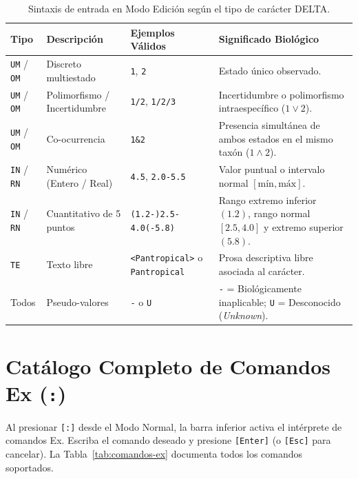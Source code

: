 \documentclass[11pt,a4paper]{article}
\newcommand{\keystroke}[1]{\texttt{[#1]}}
\begin{document}
\begin{table}[ht]
\centering
\small
\caption{Sintaxis de entrada en Modo Edición según el tipo de carácter DELTA.}
\label{tab:sintaxis-edicion}
\begin{tabularx}{\textwidth}{@{}l l l X@{}}
\toprule
\textbf{Tipo} & \textbf{Descripción} & \textbf{Ejemplos Válidos} & \textbf{Significado Biológico} \\
\midrule
\texttt{UM} / \texttt{OM} & Discreto multiestado & \texttt{1}, \texttt{2} & Estado único observado. \\
\texttt{UM} / \texttt{OM} & Polimorfismo / Incertidumbre & \texttt{1/2}, \texttt{1/2/3} & Incertidumbre o polimorfismo intraespecífico ($1 \lor 2$). \\
\texttt{UM} / \texttt{OM} & Co-ocurrencia & \texttt{1\&2} & Presencia simultánea de ambos estados en el mismo taxón ($1 \land 2$). \\
\texttt{IN} / \texttt{RN} & Numérico (Entero / Real) & \texttt{4.5}, \texttt{2.0-5.5} & Valor puntual o intervalo normal $[\text{mín}, \text{máx}]$. \\
\texttt{IN} / \texttt{RN} & Cuantitativo de 5 puntos & \texttt{(1.2-)2.5-4.0(-5.8)} & Rango extremo inferior $(1.2)$, rango normal $[2.5, 4.0]$ y extremo superior $(5.8)$. \\
\texttt{TE} & Texto libre & \texttt{<Pantropical>} o \texttt{Pantropical} & Prosa descriptiva libre asociada al carácter. \\
Todos & Pseudo-valores & \texttt{-} \quad o \quad \texttt{U} & \texttt{-} = Biológicamente inaplicable; \texttt{U} = Desconocido (\textit{Unknown}). \\
\bottomrule
\end{tabularx}
\end{table}

\section{Catálogo Completo de Comandos Ex (\texttt{:})}
\label{sec:comandos}

Al presionar \keystroke{:} desde el Modo Normal, la barra inferior activa el intérprete de comandos Ex. Escriba el comando deseado y presione \keystroke{Enter} (o \keystroke{Esc} para cancelar). La Tabla~\ref{tab:comandos-ex} documenta todos los comandos soportados.
\end{document}
